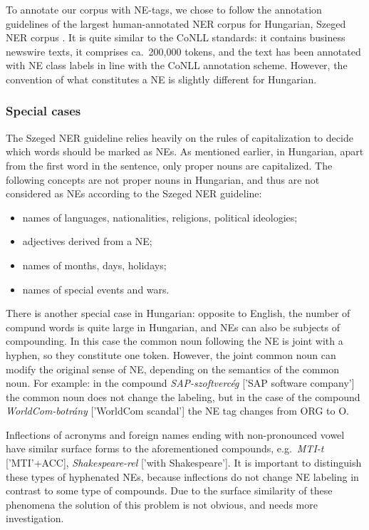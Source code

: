 \documentclass[11pt]{article}
\begin{document}
To annotate our corpus with NE-tags, we chose to follow the annotation guidelines of the largest human-annotated NER corpus for Hungarian, Szeged NER corpus \cite{Szarvas:06}. It is quite similar to the CoNLL standards: it contains business newswire texts, it comprises ca.~200,000 tokens, and the text has been annotated with NE class labels in line with the CoNLL annotation scheme. However, the convention of what constitutes a NE is slightly different for Hungarian. 

\subsubsection{Special cases}

The Szeged NER guideline relies heavily on the rules of capitalization to decide which words should be marked as NEs. As mentioned earlier, in Hungarian, apart from the first word in the sentence, only proper nouns are capitalized. The following concepts are not proper nouns in Hungarian, and thus are not considered as NEs according to the Szeged NER guideline:

\begin{itemize}
\item names of languages, nationalities, religions, political ideologies;
\item adjectives derived from a NE;
\item names of months, days, holidays;
\item names of special events and wars.
\end{itemize}

There is another special case in Hungarian: opposite to English, the number of compund words is quite large in Hungarian, and NEs can also be subjects of compounding. In this case the common noun following the NE is joint with a hyphen, so they constitute one token. However, the joint common noun can modify the original sense of NE, depending on the semantics of the common noun. For example: in the compound \textit{SAP-szoftvercég} ['SAP software company'] the common noun does not change the labeling, but in the case of the compound \textit{WorldCom-botrány} ['WorldCom scandal'] the NE tag changes from ORG to O. 

Inflections of acronyms and foreign names ending with non-pronounced vowel have similar surface forms to the aforementioned compounds, e.g.~\textit{MTI-t} ['MTI'+ACC], \textit{Shakespeare-rel} ['with Shakespeare']. It is important to distinguish these types of hyphenated NEs, because inflections do not change NE labeling in contrast to some type of compounds. Due to the surface similarity of these phenomena the solution of this problem is not obvious, and needs more investigation. 
\end{document}
